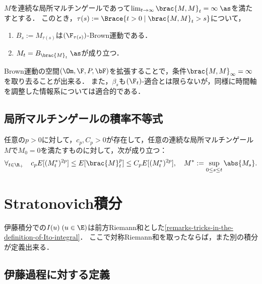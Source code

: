 \documentclass[uplatex,dvipdfmx]{jsreport}
\begin{document}
\begin{theorem}
    $M$を連続な局所マルチンゲールであって$\lim_{t\to\infty}\brac{M,M}_t=\infty\;\as$を満たすとする．
    このとき，$\tau(s):=\Brace{t>0\mid\brac{M,M}_t>s}$について，
    \begin{enumerate}
        \item $B_s:=M_{\tau(s)}$は$(\F_{\tau(s)})$-Brown運動である．
        \item $M_t=B_{\brac{M}_t}\;\as$が成り立つ．
    \end{enumerate}
\end{theorem}
\begin{remark}
    Brown運動の空間$(\Om,\F,P,\bF)$を拡張することで，条件$\brac{M,M}_\infty=\infty$を取り去ることが出来る．
    また，$\beta_s$も$(\F_t)$-適合とは限らないが，同様に時間軸を調整した情報系については適合的である．
\end{remark}

\subsection{局所マルチンゲールの積率不等式}

\begin{theorem}
    任意の$p>0$に対して，$c_p,C_p>0$が存在して，任意の連続な局所マルチンゲール$M$で$M_0=0$を満たすものに対して，次が成り立つ：
    \[\forall_{t\in\R_+}\quad c_pE[(M^*_t)^{2p}]\le E[\brac{M}_t^p]\le C_pE[(M^*_t)^{2p}],\quad M^*:=\sup_{0\le s\le t}\abs{M_s}.\]
\end{theorem}

\section{Stratonovich積分}

\begin{tcolorbox}[colframe=ForestGreen, colback=ForestGreen!10!white,breakable,colbacktitle=ForestGreen!40!white,coltitle=black,fonttitle=\bfseries\sffamily,
title=]
    伊藤積分での$I(u)\;(u\in\E)$は前方Riemann和とした\ref{remarks-tricks-in-the-definition-of-Ito-integral}．
    ここで対称Riemann和を取ったならば，また別の積分が定義出来る．
\end{tcolorbox}

\subsection{伊藤過程に対する定義}
\end{document}
